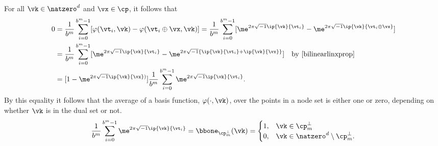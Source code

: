\documentclass[]{elsarticle}
\theoremstyle{definition}
\renewcommand{\bbK}{\natzero^d}
\begin{document}
For all $\vk \in \bbK$ and $\vx \in \cp$, it follows that
\begin{align*} 
\nonumber
0 & = \frac{1}{b^m} \sum_{i=0}^{b^m-1} [\varphi(\vt_i,\vk) - \varphi(\vt_i \oplus \vx,\vk)]  
= \frac{1}{b^m} \sum_{i=0}^{b^m-1} [\me^{2 \pi \sqrt{-1} \ip{\vk}{\vt_i}} - \me^{2 \pi \sqrt{-1} \ip{\vk}{\vt_i \oplus \vx}}]\\
\nonumber
& = \frac{1}{b^m} \sum_{i=0}^{b^m-1} [\me^{2 \pi \sqrt{-1} \ip{\vk}{\vt_i}} - \me^{2 \pi \sqrt{-1} \{\ip{\vk}{\vt_i}+\ip{\vk}{\vx}\}}] \quad \text{by } \eqref{bilinearlinxprop}\\
\label{sumeq}
& = [1 - \me^{2 \pi \sqrt{-1} \ip{\vk}{\vx})}] \frac{1}{b^m} \sum_{i=0}^{b^m-1}  \me^{2 \pi \sqrt{-1} \ip{\vk}{\vt_i}}.
\end{align*}
By this equality it follows that the average of a basis function, $\varphi(\cdot,\vk)$, over the points in a node set is either one or zero, depending on whether $\vk$ is in the dual set or not.
\begin{equation*}
\frac{1}{b^m} \sum_{i=0}^{b^m-1}  \me^{2 \pi \sqrt{-1} \ip{\vk}{\vt_i}} = \bbone_{\cp_m^{\perp}}(\vk) = \begin{cases} 1 , & \vk \in \cp_m^{\perp}\\
 0,  & \vk \in \bbK \setminus \cp_m^{\perp}.
 \end{cases}
\end{equation*}
\end{document}
